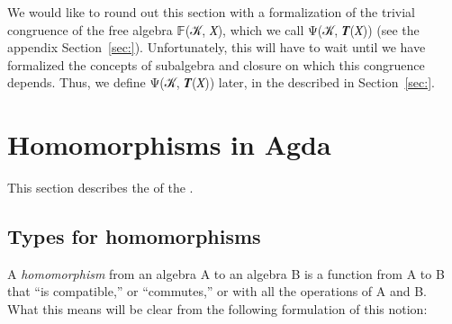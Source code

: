 \documentclass[a4paper,USenglish,cleveref,autoref,thm-restate]{lipics-v2019}
\begin{document}
We would like to round out this section with a formalization of the trivial congruence of the free algebra 𝔽(𝒦, 𝑋), which we call Ψ(𝒦, 𝑻(𝑋)) (see the appendix Section~\ref{sec:}). Unfortunately, this will have to wait until we have formalized the concepts of subalgebra and closure on which this congruence depends. Thus, we define Ψ(𝒦, 𝑻(𝑋)) later, in the \closuremodule described in Section~\ref{sec:}.

\section{Homomorphisms in Agda}\label{sec:homs-in-agda}
This section describes the \homsmodule of the \agdaualib.

\subsection{Types for homomorphisms}\label{types-for-homomorphisms}
A \emph{homomorphism} from an algebra \alg A to an algebra \alg B is a function from \m A to \m B that ``is compatible,'' or ``commutes,'' or  with all the operations of \alg A and \alg B. What this means will be clear from the following \agda formulation of this notion:
\end{document}
